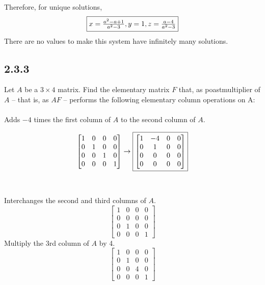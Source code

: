 \documentclass[letterpaper]{report}
\begin{document}
Therefore, for unique solutions, 
\[
    \fbox{$x = \frac{a^2 - a + 1}{a^2 - 3}, y = 1, z = \frac{a - 4}{a^2 - 3}$}
\] 
There are no values to make this system have infinitely many solutions. 

\subsection{2.3.3}%
\label{sub:2.3.3}

Let $A$ be a $3 \times  4$ matrix. Find the elementary matrix $F$ that, as poastmultiplier of $A$ -- that is, as $AF$ -- performs the following elementary column operations on A:  \\ \\ 
Adds $-4$ times the first column of $A$ to the second column of $A$. 

\[
\begin{bmatrix} 
    1 & 0 & 0 & 0 \\
    0 & 1 & 0 & 0 \\
    0 & 0 & 1 & 0 \\
    0 & 0 & 0 & 1 
\end{bmatrix}  \to 
\fbox{$
\begin{bmatrix} 
    1 & -4 & 0 & 0  \\
    0 & 1 & 0 & 0 \\
    0 & 0 & 0 & 0 \\
    0 & 0 & 0 & 0 
\end{bmatrix}$}
\] 
\\ \\ 
Interchanges the second and third columns of $A$. 
\[
\begin{bmatrix} 
    1 & 0 & 0 & 0 \\
    0 & 0 & 0 & 0 \\
    0 & 1 & 0 & 0 \\
    0 & 0 & 0 & 1
\end{bmatrix} 
\] 
Multiply the 3rd column of $A$ by 4. 
\[
\begin{bmatrix} 
    1 & 0 & 0 & 0 \\
    0 & 1 & 0 & 0 \\
    0 & 0 & 4 & 0 \\
    0 & 0 & 0 & 1
\end{bmatrix} 
\] 
\end{document}
